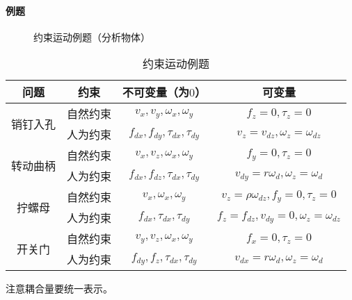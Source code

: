 \documentclass[
12pt, %
a4paper, 
oneside, %
headinclude,footinclude, %
]{scrartcl}
\begin{document}
\paragraph{例题}
\begin{figure}[H]
\centering
\subfloat[销钉入孔（钉子）]{\texttt{[image: 8.1]}} \quad
\subfloat[转动曲柄（扳手）]{\texttt{[image: 8.2]}} \quad
\subfloat[拧螺母（螺刀）]{\texttt{[image: 8.3]}} \quad
{} 
\caption{约束运动例题（分析物体）}
\end{figure}
{\footnotesize
\begin{table}[H]
\centering
\begin{tabular}{c|c|c|c}
\hline
问题 & 约束 & 不可变量（为$ 0 $） & 可变量 \\
\hline
\multirow{2}{*}{销钉入孔} & 自然约束 & $ v_x, v_y, \omega_x, \omega_y $ & $ f_z = 0, \tau_z = 0 $ \\
\cline{2-4}
& 人为约束 & $ f_{dx}, f_{dy}, \tau_{dx},  \tau_{dy} $ & $ v_z = v_{dz}, \omega_z = \omega_{dz} $ \\
\hline
\multirow{2}{*}{转动曲柄} & 自然约束 & $ v_x, v_z, \omega_x, \omega_y $ & $ f_y = 0, \tau_z = 0 $ \\
\cline{2-4}
& 人为约束 & $ f_{dx}, f_{dz}, \tau_{dx}, \tau_{dy} $ & $ v_{dy} = r\omega_d, \omega_z = \omega_d $ \\
\hline
\multirow{2}{*}{拧螺母} & 自然约束 & $ v_x, \omega_x, \omega_y $ & $ v_z = \rho \omega_{dz}, f_y = 0, \tau_z = 0 $ \\
\cline{2-4}
& 人为约束 & $ f_{dx}, \tau_{dx}, \tau_{dy} $ & $ f_z = f_{dz}, v_{dy} = 0, \omega_z = \omega_{dz} $ \\
\hline
\multirow{2}{*}{开关门} & 自然约束 & $ v_y, v_z, \omega_x, \omega_y $ & $ f_x = 0, \tau_z = 0 $ \\
\cline{2-4}
& 人为约束 & $ f_{dy}, f_z, \tau_{dx}, \tau_{dy} $ & $ v_{dx} = r \omega_d, \omega_z = \omega_d $ \\
\hline
\end{tabular}
\caption{约束运动例题}
\end{table}

注意耦合量要统一表示。
}
\end{document}
